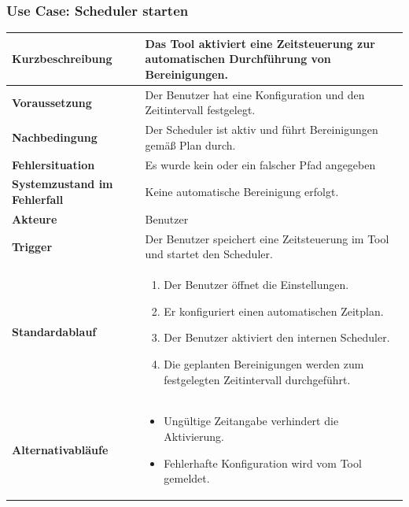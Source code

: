 \subsubsection*{Use Case: Scheduler starten}
\begin{tabular}{|p{5cm}|p{10cm}|}
\hline
\textbf{Kurzbeschreibung} & Das Tool aktiviert eine Zeitsteuerung zur automatischen Durchführung von Bereinigungen. \\
\hline
\textbf{Voraussetzung} & Der Benutzer hat eine Konfiguration und den Zeitintervall festgelegt. \\
\hline
\textbf{Nachbedingung} & Der Scheduler ist aktiv und führt Bereinigungen gemäß Plan durch. \\
\hline
\textbf{Fehlersituation} & Es wurde kein oder ein falscher Pfad angegeben \\
\hline
\textbf{Systemzustand im Fehlerfall} & Keine automatische Bereinigung erfolgt. \\
\hline
\textbf{Akteure} & Benutzer \\
\hline
\textbf{Trigger} & Der Benutzer speichert eine Zeitsteuerung im Tool und startet den Scheduler. \\
\hline
\textbf{Standardablauf} &
\begin{enumerate}
    \item Der Benutzer öffnet die Einstellungen.
    \item Er konfiguriert einen automatischen Zeitplan.
    \item Der Benutzer aktiviert den internen Scheduler.
    \item Die geplanten Bereinigungen werden zum festgelegten Zeitintervall durchgeführt.
\end{enumerate}
\\
\hline
\textbf{Alternativabläufe} &
\begin{itemize}
    \item Ungültige Zeitangabe verhindert die Aktivierung.
    \item Fehlerhafte Konfiguration wird vom Tool gemeldet.
\end{itemize}
\\
\hline
\end{tabular}

\vspace{1cm}

